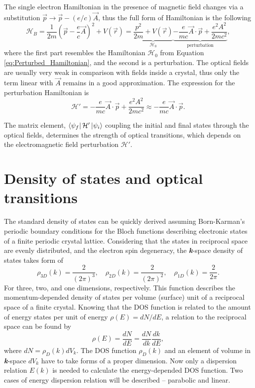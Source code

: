\documentclass[titlepage,a4paper]{book}
\newcommand{\wciecie}{\quad\phantom{v}}
\begin{document}
The single electron Hamiltonian in the presence of magnetic field changes via a substitution $\vec{p} \rightarrow \vec{p} - (e/c)\vec{A}$, thus the full form of Hamiltonian is the following
\begin{equation}
\label{eq:Perturbed_Hamiltonian2}
\mathcal{H}_{B} = \frac{1}{2m}\left( \vec{p} - \frac{e}{c}\vec{A}\right)^2 + V(\vec{r}) = \underbrace{\frac{p^2}{2m} + V(\vec{r})}_{\mathcal{H}_0} \underbrace{-\frac{e}{mc}\vec{A}\cdot\vec{p}+\frac{e^2 A^2}{2mc^2}}_{\text{perturbation}},
\end{equation}
where the first part resembles the Hamiltonian $\mathcal{H}_0$ from Equation \ref{eq:Perturbed_Hamiltonian}, and the second is a perturbation. The optical fields are usually very weak in comparison with fields inside a crystal, thus only the term linear with $\vec{A}$ remains in a good approximation. The expression for the perturbation Hamiltonian is
\begin{equation}
\label{eq:Perturbed_Hamiltonian3}
\mathcal{H}' = -\frac{e}{mc}\vec{A}\cdot\vec{p}+\frac{e^2 A^2}{2mc^2} \approx -\frac{e}{mc}\vec{A}\cdot\vec{p}.
\end{equation}

The matrix element, $\bra{\psi_f}\mathcal{H}'\ket{\psi_i}$ coupling the initial and final states through the optical fields, determines the strength of optical transitions, which depends on the electromagnetic field perturbation $\mathcal{H}'$.


\section{Density of states and optical transitions}
\label{section:DOS}
\wciecie
The standard density of states can be quickly derived assuming Born-Karman's periodic boundary conditions for the Bloch functions describing electronic states of a finite periodic crystal lattice. Considering that the states in reciprocal space are evenly distributed, and the electron spin degeneracy, the \textbf{\textit{k}}-space density of states takes form of
\begin{equation}
\label{eq:DOS_2}
\rho_{3D} (k) = \frac{2}{(2\pi)^{3}},\quad \rho_{2D} (k) = \frac{2}{(2\pi)^{2}},\quad \rho_{1D} (k) = \frac{2}{2\pi}.
\end{equation}
For three, two, and one dimensions, respectively. This function describes the momentum-depended density of states per volume (surface) unit of a reciprocal space of a finite crystal. Knowing that the DOS function is related to the amount of energy states per unit of energy $\rho (E) = dN/dE$, a relation to the reciprocal space can be found by
\begin{equation}
\label{eq:DOS_3}
\rho (E) = \frac{dN}{dE} = \frac{dN}{dk}\frac{dk}{dE},
\end{equation}
where $dN = \rho_D (k) dV_k$. The DOS function $\rho_D (k)$ and an element of volume in \textbf{\textit{k}}-space $dV_k$ have to take forms of a proper dimension. Now only a dispersion relation $E(k)$ is needed to calculate the energy-depended DOS function. Two cases of energy dispersion relation will be described -- parabolic and linear.
 
\end{document}
